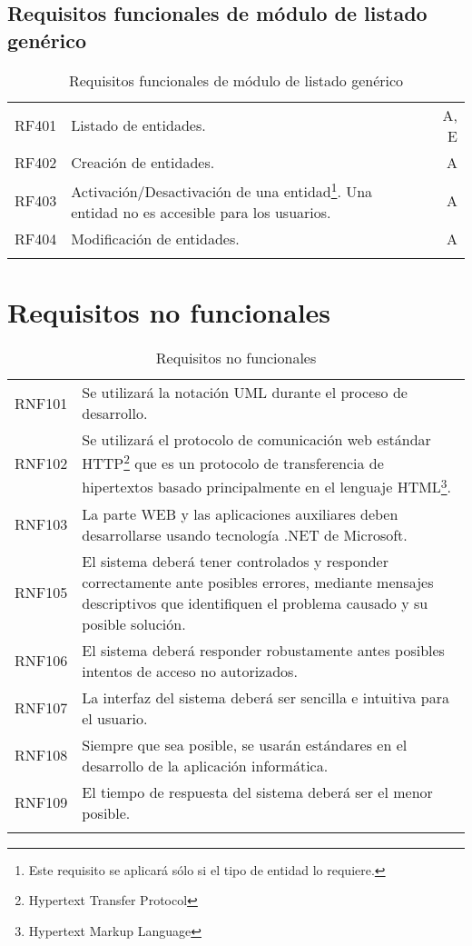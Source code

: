 \subsection{Requisitos funcionales de módulo de listado genérico}
\label{cuadro:requisitos-funcionales-de-organizaciones}
\begin{longtable}{l|p{13cm}|r}
  RF401\label{RF401} & Listado de entidades. & A, E \\
  RF402\label{RF402} & Creación de entidades. & A \\
  RF403\label{RF403} & Activación/Desactivación de una entidad\footnote{Este requisito se aplicará sólo si el tipo de entidad lo requiere.}. Una entidad no es accesible para los usuarios. & A \\
  RF404\label{RF404} & Modificación de entidades. & A \\
  \caption{Requisitos funcionales de módulo de listado genérico} \\
\end{longtable}

\section{Requisitos no funcionales}

\label{cuadro:requisitos-no-funcionales}
\begin{longtable}{l|p{13.7cm}}  
  RNF101\label{RNF101} & Se utilizará la notación UML durante el proceso de desarrollo. \\
  RNF102\label{RNF102} & Se utilizará el protocolo de comunicación web estándar HTTP\footnote{Hypertext Transfer Protocol} que es un protocolo de transferencia de hipertextos basado principalmente en el lenguaje HTML\footnote{Hypertext Markup Language }. \\
  RNF103\label{RNF103} & La parte WEB y las aplicaciones auxiliares deben desarrollarse usando tecnología .NET de Microsoft. \\
  RNF105\label{RNF104} & El sistema deberá tener controlados y responder correctamente ante posibles errores, mediante mensajes descriptivos que identifiquen el problema causado y su posible solución. \\
  RNF106\label{RNF105} & El sistema deberá responder robustamente antes posibles intentos de acceso no autorizados. \\
  RNF107\label{RNF106} & La interfaz del sistema deberá ser sencilla e intuitiva para el usuario. \\
  RNF108\label{RNF107} & Siempre que sea posible, se usarán estándares en el desarrollo de la aplicación informática. \\
  RNF109\label{RNF108} & El tiempo de respuesta del sistema deberá ser el menor posible. \\
  \caption{Requisitos no funcionales} \\
\end{longtable}

